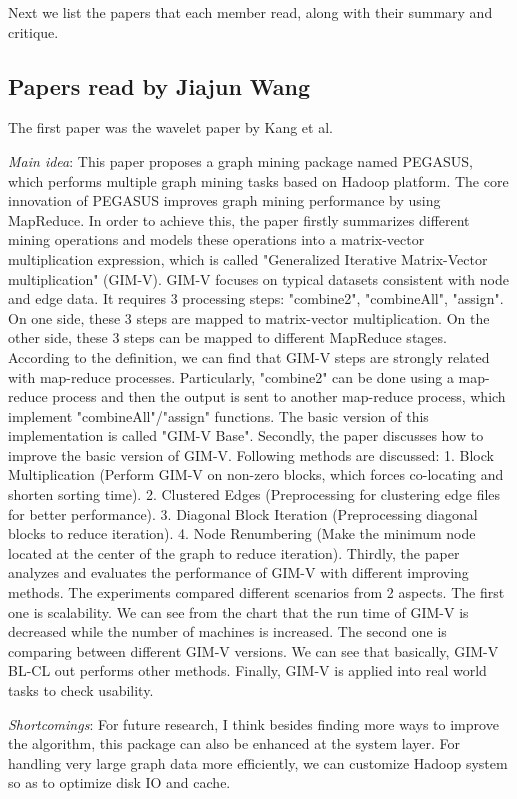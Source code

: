 Next we list the papers that each member read,
along with their summary and critique.

\subsection{Papers read by Jiajun Wang}
The first paper was the wavelet paper by Kang et al.
\cite{Kang:2011ve}
\begin{itemize*}
\item {\em Main idea}: This paper proposes a graph mining package named PEGASUS, which performs multiple graph mining tasks based on Hadoop platform. The core innovation of PEGASUS improves graph mining performance by using MapReduce.
In order to achieve this, the paper firstly summarizes different mining operations and models these operations into a matrix-vector multiplication expression, which is called "Generalized Iterative Matrix-Vector multiplication" (GIM-V). GIM-V focuses on typical datasets consistent with node and edge data. It requires 3 processing steps: "combine2", "combineAll", "assign". On one side, these 3 steps are mapped to matrix-vector multiplication. On the other side, these 3 steps can be mapped to different MapReduce stages. According to the definition, we can find that GIM-V steps are strongly related with map-reduce processes. Particularly, "combine2" can be done using a map-reduce process and then the output is sent to another map-reduce process, which implement "combineAll"/"assign" functions. The basic version of this implementation is called "GIM-V Base".
Secondly, the paper discusses how to improve the basic version of GIM-V. Following methods are discussed: 1. Block Multiplication (Perform GIM-V on non-zero blocks, which forces co-locating and shorten sorting time). 2. Clustered Edges (Preprocessing for clustering edge files for better performance). 3. Diagonal Block Iteration (Preprocessing diagonal blocks to reduce iteration). 4. Node Renumbering (Make the minimum node located at the center of the graph to reduce iteration).
Thirdly, the paper analyzes and evaluates the performance of GIM-V with different improving methods. The experiments compared different scenarios from 2 aspects. The first one is scalability. We can see from the chart that the run time of GIM-V is decreased while the number of machines is increased. The second one is comparing between different GIM-V versions. We can see that basically, GIM-V BL-CL out performs other methods.
Finally, GIM-V is applied into real world tasks to check usability.
\item {\em Shortcomings}:
	For future research, I think besides finding more ways to improve the algorithm, this package can also be enhanced at the system layer. For handling very large graph data more efficiently, we can customize Hadoop system so as to optimize disk IO and cache.
\end{itemize*}

